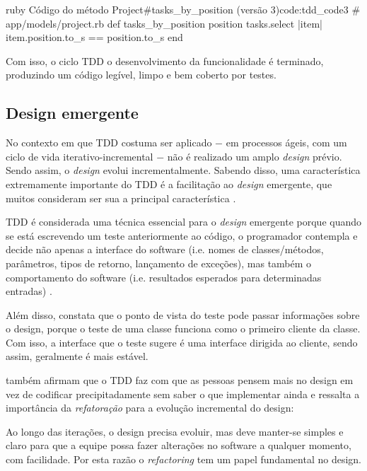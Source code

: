 \begin{mycode}{ruby}%
{Código do método Project\#tasks\_by\_position (versão 3)}{code:tdd_code3}
# app/models/project.rb
def tasks_by_position position
  tasks.select { |item| item.position.to_s == position.to_s }
end
\end{mycode}

Com isso, o ciclo TDD o desenvolvimento da funcionalidade é terminado, produzindo um código legível, limpo e bem coberto por testes.

\subsection{Design emergente} %
\label{sub:design_emergente}

No contexto em que TDD costuma ser aplicado $-$ em processos ágeis, com um ciclo de vida iterativo-incremental $-$ não é realizado um amplo \textit{design} prévio. Sendo assim, o \textit{design} evolui incrementalmente. Sabendo disso, uma característica extremamente importante do TDD é a facilitação ao \textit{design} emergente, que muitos consideram ser sua a principal característica \cite{EmergentDesign}.

TDD é considerada uma técnica essencial para o \textit{design} emergente porque
quando se está escrevendo um teste anteriormente ao código, o programador contempla e decide não apenas a interface do software (i.e. nomes de classes/métodos, parâmetros, tipos de retorno, lançamento de exceções), mas também o comportamento do software (i.e. resultados esperados para determinadas entradas) \cite{JanzenTDD}.

Além disso,  constata que o ponto de vista do teste pode passar informações sobre o design, porque o teste de uma classe funciona como o primeiro cliente da classe. Com isso, a interface que o teste sugere é uma interface dirigida ao cliente, sendo assim, geralmente é mais estável.

 também afirmam que o TDD faz com que as pessoas pensem mais no design em vez de codificar precipitadamente sem saber o que implementar ainda e  ressalta a importância da \textit{refatoração} para a evolução incremental do design:

\begin{citacao}
Ao longo das iterações, o design precisa evoluir, mas deve manter-se simples e claro para que a equipe possa fazer alterações no software a qualquer momento, com facilidade. Por esta razão o \textit{refactoring} tem um papel fundamental no design.
\end{citacao}

